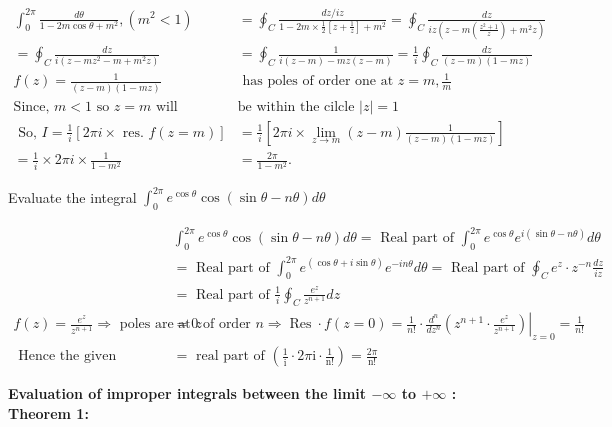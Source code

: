 \begin{answer}
	\begin{align*}
	\int_{0}^{2 \pi} \frac{d \theta}{1-2 m \cos \theta+m^{2}},\left(m^{2}<1\right)&=\oint_{C} \frac{d z / i z}{1-2 m \times \frac{1}{2}\left[z+\frac{1}{z}\right]+m^{2}}=\oint_{C} \frac{d z}{i z\left(z-m\left(\frac{z^{2}+1}{z}\right)+m^{2} z\right)} \\
	=\oint_{C} \frac{d z}{i\left(z-m z^{2}-m+m^{2} z\right)}&=\oint_{C} \frac{1}{i(z-m)-m z(z-m)}=\frac{1}{i} \oint_{C} \frac{d z}{(z-m)(1-m z)} \\
	f(z)=\frac{1}{(z-m)(1-m z)}& \text { has poles of order one at } z=m, \frac{1}{m}\\
	\text{Since, $m<1$ so $z=m$ will }&\text{be within the cilcle $|z|=1$}\\
	\text { So, }
	I =\frac{1}{i}[2 \pi i \times \text { res. } f(z=m)]&=\frac{1}{i}\left[2 \pi i \times \lim _{z \rightarrow m}(z-m) \frac{1}{(z-m)(1-m z)}\right] \\
	=\frac{1}{i} \times 2 \pi i \times \frac{1}{1-m^{2}}&=\frac{2 \pi}{1-m^{2}} .
	\end{align*}
\end{answer}
\begin{exercise}
	Evaluate the integral $\int_{0}^{2 \pi} e^{\cos \theta} \cos (\sin \theta-n \theta) d \theta$
\end{exercise}
\begin{answer}
	\begin{align*}
	&\int_{0}^{2 \pi} e^{\cos \theta} \cos (\sin \theta-n \theta) d \theta=\text { Real part of } \int_{0}^{2 \pi} e^{\cos \theta} e^{i(\sin \theta-n \theta)} d \theta\\
	&=\text { Real part of } \int_{0}^{2 \pi} e^{(\cos \theta+i \sin \theta)} e^{-i n \theta} d \theta=\text { Real part of } \oint_{C} e^{z} \cdot z^{-n} \frac{d z}{i z}\\
	&=\text { Real part of } \frac{1}{i} \oint_{C} \frac{e^{z}}{z^{n+1}} d z\\
	f(z)=\frac{e^{z}}{z^{n+1}} \Rightarrow \text { poles are at } z&=0 \text { of order } n \Rightarrow \operatorname{Res} \cdot f(z=0)=\left.\frac{1}{n !} \cdot \frac{d^{n}}{d z^{n}}\left(z^{n+1} \cdot \frac{e^{z}}{z^{n+1}}\right)\right|_{z=0}=\frac{1}{n !}\\
	\text { Hence the given integral }&=\text { real part of }\left(\frac{1}{\mathrm{i}} \cdot 2 \pi \mathrm{i} \cdot \frac{1}{\mathrm{n} !}\right)=\frac{2 \pi}{\mathrm{n} !}
	\end{align*}
\end{answer}
\textbf{ Evaluation of improper integrals between the limit $-\infty$ to $+\infty$ : }\\
\textbf{Theorem 1:}\\




